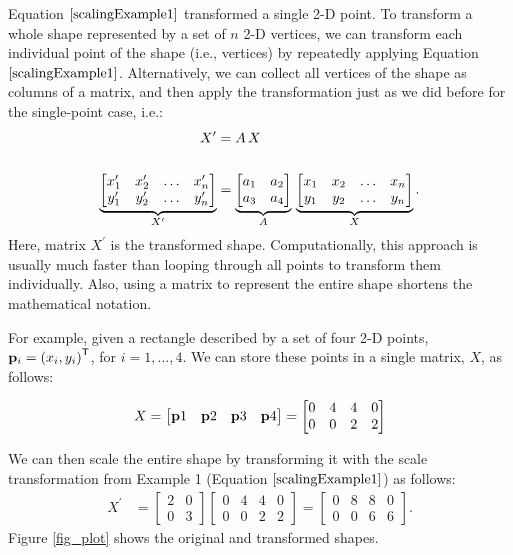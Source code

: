 \documentclass[12pt,letter]{article}
\begin{document}
Equation \(\ref{scalingExample1}\) transformed a single 2-D point. To
transform a whole shape represented by a set of \(n\) 2-D vertices, we can transform each individual point of the shape (i.e., vertices) by repeatedly applying Equation \(\ref{scalingExample1}\). Alternatively, we 
can collect all vertices of the shape as columns of a matrix, and then
apply the transformation just as we did before for the single-point
case, i.e.:
\begin{align}
	X^\prime &= A\,X \\\notag\\
  \underbrace{\begin{bmatrix}    
  x_1^\prime & x_2^\prime & \hdots &x_n^\prime\\    
  y_1^\prime & y_2^\prime & \hdots &y_n^\prime  
  \end{bmatrix}}_{X^\prime}   	&=
	\underbrace{\begin{bmatrix}
		a_1 & a_2 \\
		a_3 & a_4
	\end{bmatrix}}_{A}\,
	\underbrace{\begin{bmatrix}
		x_1 & x_2 & \hdots &x_n\\
		y_1 & y_2 & \hdots &y_n
	\end{bmatrix}}_{X}.	
\end{align}
Here, matrix \(X^\prime\) is the transformed shape. Computationally, this approach is usually much faster than looping through all points to transform them individually. Also, using a matrix to represent the entire shape shortens the mathematical notation. 

For example, given a rectangle described by a set of four 2-D points,
\({\bf p}_i =
\left( x_i, y_i\right)^\mathsf{T}\), for \(i=1,..., 4\). We can store
these points in a single matrix, \(X\), as follows:

\begin{align} 
  X = 
  \begin{bmatrix}
      {\bf p}1 & {\bf p}2 & {\bf p}3 &{\bf p}4 
  \end{bmatrix} 
  = 
\begin{bmatrix} 
	 0 & 4 & 4 & 0\\
		0 & 0 & 2 & 2  
\end{bmatrix}   
\end{align}


We can then scale the entire shape by transforming it with the scale
transformation from Example 1 (Equation \(\ref{scalingExample1}\)) as
follows:
\begin{align}
 X^\prime
 	&=
	\begin{bmatrix}
		2 & 0 \\
		0 & 3
	\end{bmatrix}
	 \begin{bmatrix}      
	 0 & 4 & 4 & 0\\ 
	 0 & 0 & 2 & 2  
	 \end{bmatrix} 
 	=
	\begin{bmatrix}
	 0 & 8 & 8 & 0\\    
	 0 & 0 & 6 & 6  
	\end{bmatrix}. 
	\label{scalingExample3}
\end{align}
Figure \ref{fig_plot} shows the original and transformed shapes. 
\end{document}
